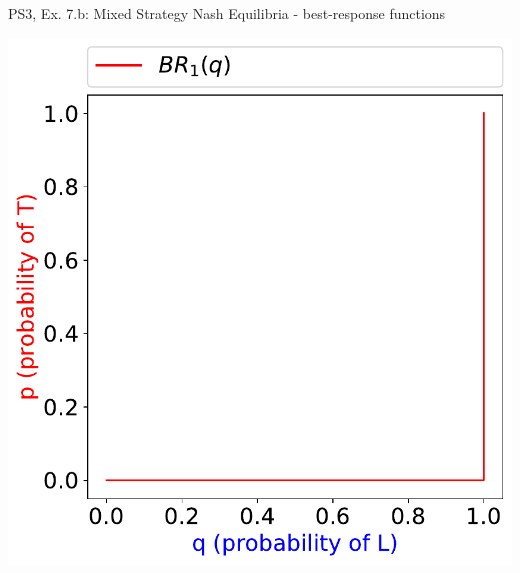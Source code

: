 \begin{frame}{PS3, Ex. 7.b: Mixed Strategy Nash Equilibria - best-response functions}
\begin{multicols}{2}
    \includegraphics[width=\columnwidth]{figures/5b1}
  \vfill\null
  \end{multicols}
\end{frame}
